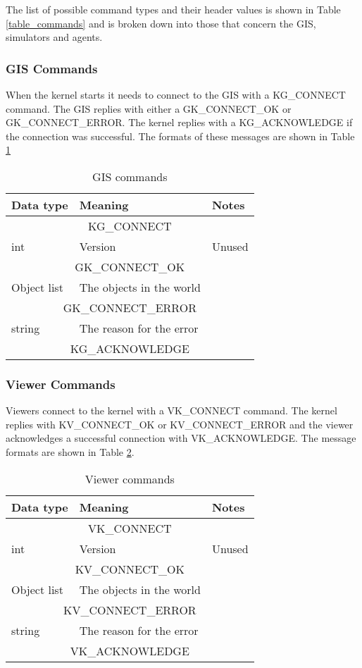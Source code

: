 The list of possible command types and their header values is shown in Table \ref{table_commands} and is broken down into those that concern the GIS, simulators and agents.

\subsubsection{GIS Commands}
When the kernel starts it needs to connect to the GIS with a KG\_CONNECT command. The GIS replies with either a GK\_CONNECT\_OK or GK\_CONNECT\_ERROR. The kernel replies with a KG\_ACKNOWLEDGE if the connection was successful. The formats of these messages are shown in Table \ref{table_gis_commands}

\begin{table}[p]
\center
\begin{tabular}{|lll|}
\hline
Data type & Meaning & Notes\\
\hline
\hline
\multicolumn{3}{|c|}{KG\_CONNECT}\\
int & Version & Unused\\
\hline
\hline
\multicolumn{3}{|c|}{GK\_CONNECT\_OK}\\
Object list & The objects in the world & \\
\hline
\hline
\multicolumn{3}{|c|}{GK\_CONNECT\_ERROR}\\
string & The reason for the error & \\
\hline
\hline
\multicolumn{3}{|c|}{KG\_ACKNOWLEDGE}\\
\hline
\end{tabular}
\caption{GIS commands}
\label{table_gis_commands}
\end{table}

\subsubsection{Viewer Commands}
Viewers connect to the kernel with a VK\_CONNECT command. The kernel replies with KV\_CONNECT\_OK or KV\_CONNECT\_ERROR and the viewer acknowledges a successful connection with VK\_ACKNOWLEDGE. The message formats are shown in Table \ref{table_viewer_commands}.

\begin{table}[p]
\center
\begin{tabular}{|lll|}
\hline
Data type & Meaning & Notes\\
\hline
\hline
\multicolumn{3}{|c|}{VK\_CONNECT}\\
int & Version & Unused\\
\hline
\hline
\multicolumn{3}{|c|}{KV\_CONNECT\_OK}\\
Object list & The objects in the world & \\
\hline
\hline
\multicolumn{3}{|c|}{KV\_CONNECT\_ERROR}\\
string & The reason for the error & \\
\hline
\hline
\multicolumn{3}{|c|}{VK\_ACKNOWLEDGE}\\
\hline
\end{tabular}
\caption{Viewer commands}
\label{table_viewer_commands}
\end{table}

